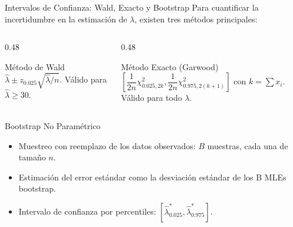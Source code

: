 \documentclass[10pt, aspectratio=169]{beamer}
\begin{document}
\begin{frame}{Intervalos de Confianza: Wald, Exacto y Bootstrap}
  \footnotesize
  Para cuantificar la incertidumbre en la estimación de $\lambda$, existen tres métodos principales: \pause

  \vspace{0.1cm}
  \begin{columns}[T]
    \begin{column}{0.48\textwidth}
      \begin{block}{Método de Wald}
        \scriptsize
        $\hat{\lambda} \pm z_{0.025}\sqrt{\hat{\lambda}/n}$. Válido para $\hat{\lambda} \ge 30$.
      \end{block}
    \end{column}
    \begin{column}{0.48\textwidth}
      \begin{block}{Método Exacto (Garwood)}
        \scriptsize
        $\left[\dfrac{1}{2n}\chi^{2}_{0.025, 2k}, \dfrac{1}{2n}\chi^{2}_{0.975, 2(k+1)}\right]$ con $k = \sum x_{i}$. Válido para todo $\lambda$.
      \end{block}
    \end{column}
  \end{columns}

  \vspace{0.15cm}
  \pause
  \begin{alertblock}{Bootstrap No Paramétrico}
    \begin{itemize}\itemsep=0.04cm
      \item Muestreo con reemplazo de los datos observados: $B$ muestras, cada una de tamaño $n$.
      \item Estimación del error estándar como la desviación estándar de los B MLEs bootstrap.
      \item Intervalo de confianza por percentiles: $[\hat{\lambda}^{*}_{0.025}, \hat{\lambda}^{*}_{0.975}]$.
    \end{itemize}
  \end{alertblock}
\end{frame}
\end{document}
